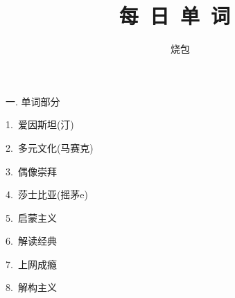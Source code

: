 \documentclass[a4paper, 12pt]{article}
\begin{document}
    \noindent

    \title{每\ 日\ 单\ 词\ }
    \author{烧包}
    \maketitle

\begin{flushleft}
一. 单词部分
\end{flushleft}

\begin{multicols}{2}
\begin{flushleft}
1.\ 爱因斯坦(汀) \ \ \ \ \underline{\hspace{3cm}}
\end{flushleft}

\begin{flushleft}
2.\ 多元文化(马赛克) \ \ \ \ \underline{\hspace{3cm}}
\end{flushleft}
\end{multicols}

\begin{multicols}{2}
\begin{flushleft}
3.\ 偶像崇拜 \ \ \ \ \underline{\hspace{3cm}}
\end{flushleft}

\begin{flushleft}
4.\ 莎士比亚(摇茅e) \ \ \ \ \underline{\hspace{3cm}}
\end{flushleft}
\end{multicols}

\begin{multicols}{2}
\begin{flushleft}
5.\ 启蒙主义 \ \ \ \ \underline{\hspace{3cm}}
\end{flushleft}

\begin{flushleft}
6.\ 解读经典 \ \ \ \ \underline{\hspace{3cm}}
\end{flushleft}
\end{multicols}

\begin{multicols}{2}
\begin{flushleft}
7.\ 上网成瘾 \ \ \ \ \underline{\hspace{3cm}}
\end{flushleft}

\begin{flushleft}
8.\ 解构主义 \ \ \ \ \underline{\hspace{3cm}}
\end{flushleft}
\end{multicols}
\end{document}
